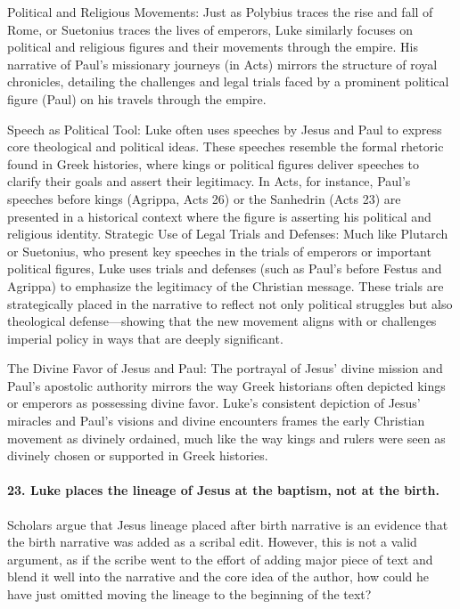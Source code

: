 Political and Religious Movements: Just as Polybius traces the rise and fall of Rome, or Suetonius traces the lives of emperors, Luke similarly focuses on political and religious figures and their movements through the empire.
His narrative of Paul's missionary journeys (in Acts) mirrors the structure of royal chronicles, detailing the challenges and legal trials faced by a prominent political figure (Paul) on his travels through the empire.

Speech as Political Tool: Luke often uses speeches by Jesus and Paul to express core theological and political ideas.
These speeches resemble the formal rhetoric found in Greek histories, where kings or political figures deliver speeches to clarify their goals and assert their legitimacy.
In Acts, for instance, Paul's speeches before kings (Agrippa, Acts 26) or the Sanhedrin (Acts 23) are presented in a historical context where the figure is asserting his political and religious identity.
Strategic Use of Legal Trials and Defenses: Much like Plutarch or Suetonius, who present key speeches in the trials of emperors or important political figures, Luke uses trials and defenses (such as Paul's before Festus and Agrippa) to emphasize the legitimacy of the Christian message.
These trials are strategically placed in the narrative to reflect not only political struggles but also theological defense---showing that the new movement aligns with or challenges imperial policy in ways that are deeply significant.

The Divine Favor of Jesus and Paul: The portrayal of Jesus' divine mission and Paul's apostolic authority mirrors the way Greek historians often depicted kings or emperors as possessing divine favor.
Luke's consistent depiction of Jesus' miracles and Paul's visions and divine encounters frames the early Christian movement as divinely ordained, much like the way kings and rulers were seen as divinely chosen or supported in Greek histories.

\paragraph{23.
Luke places the lineage of Jesus at the baptism, not at the birth.}\label{par:luke-places-the-lineage-of-jesus-at-the-baptism-not-at-the-birth.}

Scholars argue that Jesus lineage placed after birth narrative is an evidence that the birth narrative was added as a scribal edit.
However, this is not a valid argument, as if the scribe went to the effort of adding major piece of text and blend it well into the narrative and the core idea of the author, how could he have just omitted moving the lineage to the beginning of the text?

